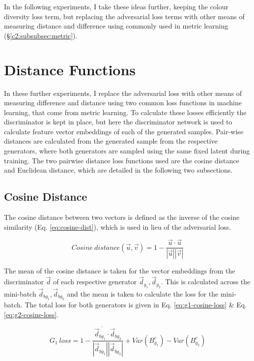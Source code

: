 In the following experiments, I take these ideas further, keeping the colour diversity loss term, but replacing the adversarial loss terms with other means of measuring distance and difference using commonly used in metric learning (\S \ref{c2:subsubsec:metric}). 
  
\section{Distance Functions}

In these further experiments, I replace the adversarial loss with other means of measuring difference and distance using two common loss functions in machine learning, that come from metric learning. 
To calculate these losses efficiently the discriminator is kept in place, but here the discriminator network is used to calculate feature vector embeddings of each of the generated samples.
Pair-wise distances are calculated from the generated sample from the respective generators, where both generators are sampled using the same fixed latent during training.
The two pairwise distance loss functions used are the cosine distance and Euclidean distance, which are detailed in the following two subsections.

\subsection{Cosine Distance}

The cosine distance between two vectors is defined as the inverse of the cosine similarity (Eq. \ref{eq:cosine-dist}), which is used in lieu of the adversarial loss. 

\begin{equation} 
    Cosine\ distance(\vec u, \vec v) = 1 - \frac{\vec u \cdot \vec u}{|\vec u||\vec v|}
    \label{eq:cosine-dist}
\end{equation}

The mean of the cosine distance is taken for the vector embeddings from the discriminator $\vec d$ of each respective generator $\vec d_{g_{1}}, \vec d_{g_{2}}$. 
This is calculated across the mini-batch $\vec d_{bg_{1}}, \vec d_{bg_{2}}$  and the mean is taken to calculate the loss for the mini-batch. 
The total loss for both generators is given in Eq. \ref{eq:g1-cosine-loss} \& Eq. \ref{eq:g2-cosine-loss}.

\begin{equation} 
    G_{1}\ loss = \overline{1 - \frac{\vec d_{bg_{1}} \cdot \vec d_{bg_{2}}}{|\vec d_{bg_{1}}||\vec d_{bg_{2}}|}} + Var(B_{g_{1}}^{c}) - Var(B_{g_{2}}^{c})
    \label{eq:g1-cosine-loss}
\end{equation}

